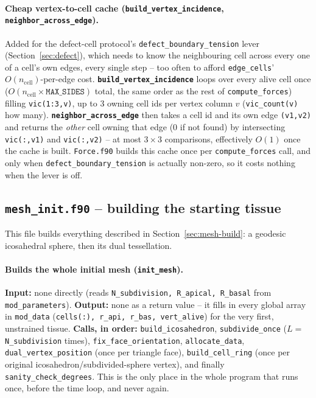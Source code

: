 \documentclass[11pt,a4paper]{report}
\begin{document}
\paragraph{Cheap vertex-to-cell cache
(\texttt{build\_vertex\_incidence}, \texttt{neighbor\_across\_edge}).}
Added for the defect-cell protocol's \texttt{defect\_boundary\_tension}
lever (Section~\ref{sec:defect}), which needs to know the neighbouring
cell across every one of a cell's own edges, every single step -- too
often to afford \texttt{edge\_cells}' $O(n_{\mathrm{cell}})$-per-edge
cost. \textbf{\texttt{build\_vertex\_incidence}} loops over every alive
cell once ($O(n_{\mathrm{cell}}\times\texttt{MAX\_SIDES})$ total, the
same order as the rest of \texttt{compute\_forces}) filling
\texttt{vic(1:3,v)}, up to 3 owning cell ids per vertex column $v$
(\texttt{vic\_count(v)} how many). \textbf{\texttt{neighbor\_across\_edge}}
then takes a cell id and its own edge \texttt{(v1,v2)} and returns the
\emph{other} cell owning that edge (0 if not found) by intersecting
\texttt{vic(:,v1)} and \texttt{vic(:,v2)} -- at most $3\times3$
comparisons, effectively $O(1)$ once the cache is built. \texttt{Force.f90}
builds this cache once per \texttt{compute\_forces} call, and only when
\texttt{defect\_boundary\_tension} is actually non-zero, so it costs
nothing when the lever is off.

\subsection{\texttt{mesh\_init.f90} -- building the starting tissue}
\label{sec:mesh-init-code}
This file builds everything described in
Section~\ref{sec:mesh-build}: a geodesic icosahedral sphere, then its
dual tessellation.
\paragraph{Builds the whole initial mesh (\texttt{init\_mesh}).}
\textbf{Input:} none directly (reads \texttt{N\_subdivision, R\_apical,
R\_basal} from \texttt{mod\_parameters}). \textbf{Output:} none as a
return value -- it fills in every global array in
\texttt{mod\_data} (\texttt{cells(:), r\_api, r\_bas, vert\_alive}) for
the very first, unstrained tissue. \textbf{Calls, in order:}
\texttt{build\_icosahedron}, \texttt{subdivide\_once} ($L=$
\texttt{N\_subdivision} times), \texttt{fix\_face\_orientation},
\texttt{allocate\_data}, \texttt{dual\_vertex\_position} (once per
triangle face), \texttt{build\_cell\_ring} (once per original
icosahedron/subdivided-sphere vertex), and finally
\texttt{sanity\_check\_degrees}. This is the only place in the whole
program that runs once, before the time loop, and never again.
\end{document}
